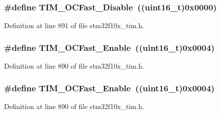 \subsubsection[{\texorpdfstring{T\+I\+M\+\_\+\+O\+C\+Fast\+\_\+\+Disable}{TIM_OCFast_Disable}}]{\setlength{\rightskip}{0pt plus 5cm}\#define T\+I\+M\+\_\+\+O\+C\+Fast\+\_\+\+Disable~(({\bf uint16\+\_\+t})0x0000)}\hypertarget{group___t_i_m___output___compare___fast___state_gab3d39f8797953cb58754205169d8278e}{}\label{group___t_i_m___output___compare___fast___state_gab3d39f8797953cb58754205169d8278e}


Definition at line 891 of file stm32f10x\+\_\+tim.\+h.

\subsubsection[{\texorpdfstring{T\+I\+M\+\_\+\+O\+C\+Fast\+\_\+\+Enable}{TIM_OCFast_Enable}}]{\setlength{\rightskip}{0pt plus 5cm}\#define T\+I\+M\+\_\+\+O\+C\+Fast\+\_\+\+Enable~(({\bf uint16\+\_\+t})0x0004)}\hypertarget{group___t_i_m___output___compare___fast___state_ga0cfb598c985363ee7004e52c97c524a3}{}\label{group___t_i_m___output___compare___fast___state_ga0cfb598c985363ee7004e52c97c524a3}


Definition at line 890 of file stm32f10x\+\_\+tim.\+h.

\subsubsection[{\texorpdfstring{T\+I\+M\+\_\+\+O\+C\+Fast\+\_\+\+Enable}{TIM_OCFast_Enable}}]{\setlength{\rightskip}{0pt plus 5cm}\#define T\+I\+M\+\_\+\+O\+C\+Fast\+\_\+\+Enable~(({\bf uint16\+\_\+t})0x0004)}\hypertarget{group___t_i_m___output___compare___fast___state_ga0cfb598c985363ee7004e52c97c524a3}{}\label{group___t_i_m___output___compare___fast___state_ga0cfb598c985363ee7004e52c97c524a3}


Definition at line 890 of file stm32f10x\+\_\+tim.\+h.

